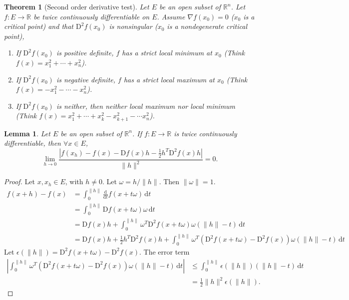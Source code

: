 \documentclass[12pt]{article}
\theoremstyle{plain}
\newtheorem{thm}{Theorem}
\newtheorem*{lemma}{Lemma}
\theoremstyle{definition}
\begin{document}
\begin{thm}[Second order derivative test]
    Let $E$ be an open subset of $\mathbb{R}^n$.
    Let $f:E\rightarrow \mathbb{R}$ be twice continuously differentiable on $E$.
    Assume $\nabla f(x_0)=0$ ($x_0$ is a critical point) and that $\mathrm{D}^2f(x_0)$ is nonsingular ($x_0$ is a nondegenerate critical point),
    \begin{enumerate}
        \item If $\mathrm{D}^2f(x_0)$ is positive definite, $f$ has a strict local minimum at $x_0$ (Think $f(x) = x_1^2+\cdots+ x_n^2$).
        \item If $\mathrm{D}^2f(x_0)$ is negative definite, $f$ has a strict local maximum at $x_0$ (Think $f(x) = -x_1^2-\cdots -x_n^2$).
        \item If $\mathrm{D}^2f(x_0)$ is neither, then neither local maximum nor local minimum (Think $f(x) = x_1^2+\cdots+x_k^2-x_{k+1}^2-\cdots x_n^2$).
    \end{enumerate}
\end{thm}
\begin{lemma}
    Let $E$ be an open subset of $\mathbb{R}^n$.
    If $f:E\rightarrow \mathbb{R}$ is twice continuously differentiable, then $\forall x\in E$,
    \[
        \lim_{h\rightarrow 0} \frac{|f(x_h)-f(x)-\mathrm{D}f(x) h - \frac{1}{2}h^T\mathrm{D}^2f(x)h|}{\|h\|^2} = 0.
    \]
\end{lemma}
\begin{proof}
    Let $x, x_h\in E$, with $h\neq 0$.
    Let $\omega=h/\|h\|$.
    Then $\|\omega\|=1$.
    \[\begin{aligned}
        f(x+h)-f(x)
        &=\int_0^{\|h\|} \frac{\mathrm{d}}{\mathrm{d}t} f(x+t\omega)\,\mathrm{d}t\\
        &=\int_0^{\|h\|} \mathrm{D}f(x+t\omega)\omega \,\mathrm{d}t\\
        &=\mathrm{D}f(x)h + \int_0^{\|h\|}\omega^T\mathrm{D}^2f(x+t\omega)\omega(\|h\|-t)\,\mathrm{d}t\\
        &=\mathrm{D}f(x)h + \frac{1}{2}h^T\mathrm{D}^2f(x)h
          +\int_0^{\|h\|} \omega^T(\mathrm{D}^2f(x+t\omega)-\mathrm{D}^2f(x))\omega (\|h\|-t)\,\mathrm{d}t
    \end{aligned}\]
    Let $\epsilon(\|h\|) = \mathrm{D}^2f(x+t\omega)-\mathrm{D}^2f(x)$.
    The error term
    \[\begin{aligned}
        |\int_0^{\|h\|} \omega^T(\mathrm{D}^2f(x+t\omega)-\mathrm{D}^2f(x))\omega (\|h\|-t)\,\mathrm{d}t|
        &\leq\int_0^{\|h\|}\epsilon(\|h\|)(\|h\|-t)\,\mathrm{d}t\\
        &=\frac{1}{2}\|h\|^2\epsilon(\|h\|).
    \end{aligned}\]
\end{proof}
\end{document}
